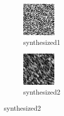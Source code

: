 \documentclass[11pt]{article}
\begin{document}
\begin{figure}[ht!]
\begin{subfigure}[]{0.333\linewidth}
        \includegraphics[width=\linewidth]{figs_for_latex_only/synthesized_0.jpg}
        \caption{synthesized1}
    \end{subfigure}%
    \hfill%
    \begin{subfigure}[]{0.333\linewidth}
        \centering
        \includegraphics[width=\linewidth]{figs_for_latex_only/synthesized_2.jpg}
        \caption{synthesized2}
    \end{subfigure}%
\end{figure}
\end{document}
